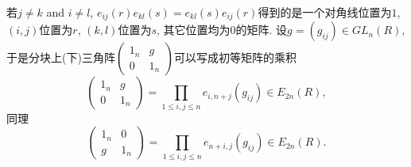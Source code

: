 若$j\neq k$ and $i\neq l$, $e_{ij}(r)e_{kl}(s)=e_{kl}(s)e_{ij}(r)$得到的是一个对角线位置为$1$, $(i,j)$位置为$r$, $(k,l)$位置为$s$, 其它位置均为$0$的矩阵. 设$g=(g_{ij})\in GL_n(R)$, 于是分块上(下)三角阵$\begin{pmatrix}
	1_n & g\\ 0 & 1_n
\end{pmatrix}$可以写成初等矩阵的乘积
\[\begin{pmatrix}
	1_n & g\\ 0 & 1_n
\end{pmatrix}=\prod_{1\leq i,j\leq n}e_{i,n+j}(g_{ij})\in E_{2n}(R),\]
同理
\[\begin{pmatrix}
	1_n & 0\\ g & 1_n
\end{pmatrix}=\prod_{1\leq i,j\leq n}e_{n+i,j}(g_{ij})\in E_{2n}(R).\]


